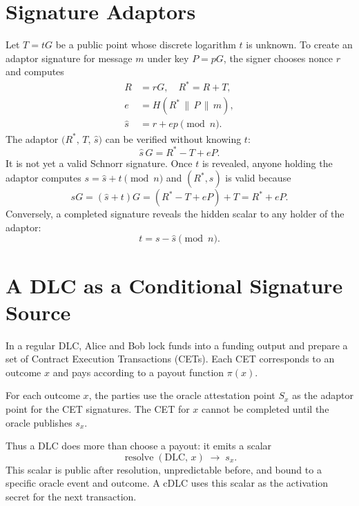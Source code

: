 \documentclass[11pt,a4paper]{article}
\theoremstyle{claimstyle}
\DeclareMathOperator{\resolve}{resolve}
\begin{document}
\section{Signature Adaptors}

Let $T = tG$ be a public point whose discrete logarithm $t$ is unknown. To
create an adaptor signature for message $m$ under key $P = pG$, the signer
chooses nonce $r$ and computes
\begin{align*}
  R   &= rG,\quad R^* = R + T,\\
  e   &= H(R^* \,\|\, P \,\|\, m),\\
  \hat{s} &= r + ep \pmod{n}.
\end{align*}
The adaptor $\bigl(R^*,\, T,\, \hat{s}\bigr)$ can be verified without knowing
$t$:
\[
  \hat{s}\,G = R^* - T + eP.
\]
It is not yet a valid Schnorr signature. Once $t$ is revealed, anyone holding
the adaptor computes $s = \hat{s} + t \pmod{n}$ and $(R^*, s)$ is valid because
\[
  sG = (\hat{s}+t)G = (R^*-T+eP)+T = R^* + eP.
\]
Conversely, a completed signature reveals the hidden scalar to any holder of the
adaptor:
\[
  t = s - \hat{s} \pmod{n}.
\]

\section{A DLC as a Conditional Signature Source}

In a regular DLC, Alice and Bob lock funds into a funding output and prepare a
set of Contract Execution Transactions (CETs). Each CET corresponds to an
outcome $x$ and pays according to a payout function $\pi(x)$.

For each outcome $x$, the parties use the oracle attestation point $S_x$ as the
adaptor point for the CET signatures. The CET for $x$ cannot be completed until
the oracle publishes $s_x$.

Thus a DLC does more than choose a payout: it emits a scalar
\[
  \resolve(\mathrm{DLC},\, x) \;\longrightarrow\; s_x.
\]
This scalar is public after resolution, unpredictable before, and bound to a
specific oracle event and outcome. A cDLC uses this scalar as the activation
secret for the next transaction.

\end{document}
